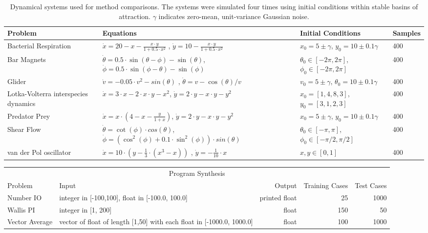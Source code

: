 \documentclass[preprint]{article}
\begin{document}
\begin{table}
\scriptsize
\caption{Dynamical systems used for method comparisons. The systems were simulated four times using initial conditions within stable basins of attraction. $\gamma$ indicates zero-mean, unit-variance Gaussian noise. }\label{tbl:ode}
\begin{tabularx}{\columnwidth}{L{0.25\columnwidth} L{0.3\columnwidth} L{0.19\columnwidth}  R{0.1\columnwidth}} 
Problem & Equations & Initial Conditions	& Samples \\ \midrule
Bacterial Respiration & $\dot{x} = 20 - x - \frac{x \cdot y}{1+0.5 \cdot x^2}$ , $ \dot{y} = 10 - \frac{x \cdot y}{1+0.5 \cdot x^2}$	& $x_0=5 \pm \gamma$, $y_0=10 \pm 0.1\gamma$ & 400 \\
Bar Magnets & $\dot{\theta} = 0.5 \cdot \sin (\theta - \phi) - \sin (\theta)$,  $ \dot{\phi} = 0.5 \cdot \sin (\phi - \theta) - \sin (\phi)$	&  $\theta_0 \in [-2\pi,2\pi]$, $\phi_0 \in [-2\pi,2\pi]$ & 400 \\
Glider & $\dot{v} = - 0.05 \cdot  v^2 - sin (\theta)$	, $ \dot{\theta} = v - \cos (\theta)/v$	& $v_0=5 \pm \gamma$, $\theta_0=10 \pm 0.1\gamma$ & 400 \\
Lotka-Volterra interspecies dynamics & $\dot{x} = 3  \cdot x - 2  \cdot x \cdot y - x^2$, $ \dot{y} = 2 \cdot y - x \cdot y - y^2$	&  $x_0=[1,4,8,3]$, $y_0 = [3, 1, 2, 3]$ & 400 \\
Predator Prey & $\dot{x} = x  \cdot \left( 4 - x - \frac{y}{1+x} \right)$, $ \dot{y} = 2 \cdot y - x \cdot y - y^2$ 	& $x_0=5 \pm \gamma$, $y_0=10 \pm 0.1\gamma$  & 400 \\
Shear Flow & $\dot{\theta} = \cot (\phi) \cdot cos(\theta)$, $ \dot{\phi} = \left(\cos ^2 (\phi) + 0.1 \cdot  \sin^2 (\phi)\right) \cdot sin(\theta)$	&  $\theta_0 \in [-\pi,\pi]$, $\phi_0 \in [-\pi/2,\pi/2]$ & 400 \\
van der Pol oscillator & $\dot{x} = 10 \cdot  \left(y - \frac{1}{3} \cdot (x^3-x) \right)$	, $ \dot{y} = -\frac{1}{10} \cdot x$		& $x,y \in [0,1]$  & 400 \\ \midrule
\end{tabularx}
\end{table}
\begin{table}
\begin{tabularx}{\columnwidth}{X X r r r} 
\multicolumn{5}{c}{Program Synthesis}\\ 
Problem	& Input & Output	& Training Cases & Test Cases \\\midrule
Number IO & integer in [-100,100], float in [-100.0, 100.0]	&	printed float & 25 & 1000 \\
Wallis PI & integer in [1, 200] & float &	150 & 50 \\
Vector Average & vector of float of length [1,50] with each float in [-1000.0, 1000.0]	& float &	100	&	1000 \\ 
\bottomrule
\end{tabularx}
\end{table}
\end{document}
